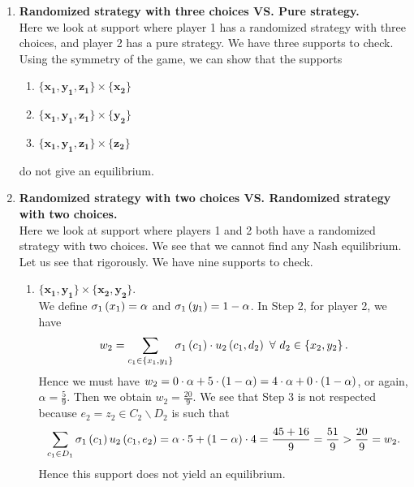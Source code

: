 \begin{enumerate} [label=\Alph*. ]
\begin{enumerate} [label*= (\arabic*)]
    \item The support $\mathbf{\{z_1\}} \times \mathbf{\{x_2, y_2, z_2\}}$ does not give an equilibrium because the support $\mathbf{\{z_1\}} \times \mathbf{\{x_2, y_2\}}$ does not give an equilibrium.
\end{enumerate}

\item \textbf{Randomized strategy with three choices VS. Pure strategy.} \\
Here we look at support where player 1 has a randomized strategy with three choices, and player 2 has a pure strategy. We have three supports to check. Using the symmetry of the game, we can show that the supports
\begin{enumerate} [label*= (\arabic*)]
    \item $\mathbf{\{x_1, y_1, z_1\}} \times \mathbf{\{x_2\}}$
    \item $\mathbf{\{x_1, y_1, z_1\}} \times \mathbf{\{y_2\}}$
    \item $\mathbf{\{x_1, y_1, z_1\}} \times \mathbf{\{z_2\}}$
\end{enumerate}

do not give an equilibrium.

\item \textbf{Randomized strategy with two choices VS. Randomized strategy with two choices.} \\
Here we look at support where players 1 and 2 both have a randomized strategy with two choices. We see that we cannot find any Nash equilibrium. Let us see that rigorously. We have nine supports to check.

\begin{enumerate} [label*= (\arabic*)]
    \item $\mathbf{\{x_1, y_1\}} \times \mathbf{\{x_2, y_2\}}$. \\
    We define $\sigma_{1} \left(x_1\right) = \alpha$ and $\sigma_{1} \left(y_1\right) = 1 - \alpha$. In Step 2, for player 2, we have
    \begin{equation*}
        w_2 = \sum_{c_1 \in \left\{x_1, y_1\right\}} \sigma_{1} \left(c_1\right) \cdot u_2 \left(c_1, d_2\right) \ \forall \ d_2 \in \left\{x_2, y_2\right\}.
    \end{equation*}
    Hence we must have $w_2 = 0 \cdot \alpha + 5 \cdot \left(1 - \alpha\right) = 4 \cdot \alpha + 0 \cdot \left(1 - \alpha\right)$, or again, $\alpha = \frac{5}{9}$. Then we obtain $w_2 = \frac{20}{9}$. We see that Step 3 is not respected because $e_2 = z_2 \in C_2 \backslash D_2$ is such that 
    \begin{equation*}
        \sum_{c_{1} \in D_{1}} \sigma_{1} \left(c_1\right) u_2 \left(c_{1}, e_2\right)
        = \alpha \cdot 5 + \left(1 - \alpha\right) \cdot 4
        = \dfrac{45 + 16}{9}
        = \dfrac{51}{9}
        > \dfrac{20}{9}
        = w_2.
    \end{equation*}
    Hence this support does not yield an equilibrium.


\end{enumerate}
\end{enumerate}
